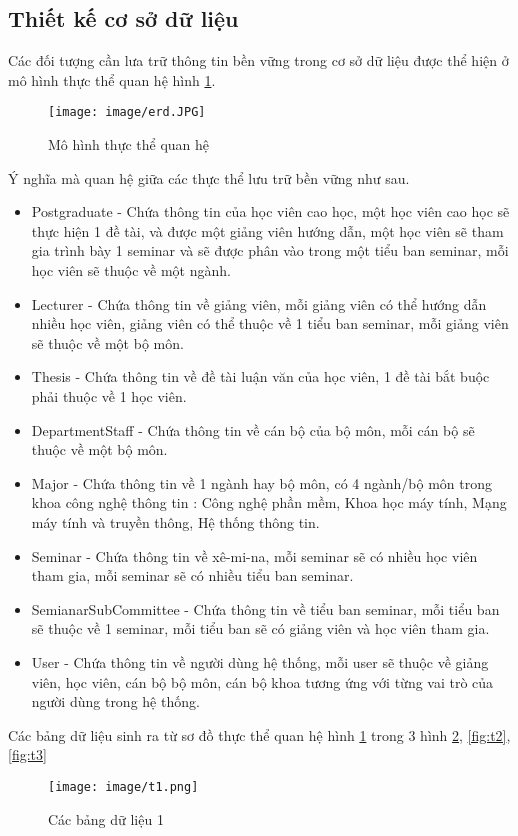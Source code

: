 \subsection{Thiết kế cơ sở dữ liệu}
Các đối tượng cần lưa trữ thông tin bền vững trong cơ sở dữ liệu được thể hiện ở mô hình thực thể quan hệ hình \ref{fig:erd}.
\begin{figure}[htbp]
	\centering
		\texttt{[image: image/erd.JPG]}
	\caption{Mô hình thực thể quan hệ}
	\label{fig:erd}
\end{figure}
Ý nghĩa mà quan hệ giữa các thực thể lưu trữ bền vững như sau.
\begin{itemize}
\item Postgraduate - Chứa thông tin của học viên cao học, một học viên cao học sẽ thực hiện 1 đề tài, và được một giảng viên hướng dẫn, một học viên sẽ tham gia trình bày 1 seminar và sẽ được phân vào trong một tiểu ban seminar, mỗi học viên sẽ thuộc về một ngành.
\item Lecturer - Chứa thông tin về giảng viên, mỗi giảng viên có thể hướng dẫn nhiều học viên, giảng viên có thể thuộc về 1 tiểu ban seminar, mỗi giảng viên sẽ thuộc về một bộ môn.
\item Thesis - Chứa thông tin về đề tài luận văn của học viên, 1 đề tài bắt buộc phải thuộc về 1 học viên.
\item  DepartmentStaff - Chứa thông tin về cán bộ của bộ môn, mỗi cán bộ sẽ thuộc về một bộ môn.
\item Major - Chứa thông tin về 1 ngành hay bộ môn, có 4 ngành/bộ môn trong khoa công nghệ thông tin : Công nghệ phần mềm, Khoa học máy tính, Mạng máy tính và truyền thông, Hệ thống thông tin.
\item Seminar - Chứa thông tin về xê-mi-na, mỗi seminar sẽ có nhiều học viên tham gia, mỗi seminar sẽ có nhiều tiểu ban seminar.
\item SemianarSubCommittee - Chứa thông tin về tiểu ban seminar, mỗi tiểu ban sẽ thuộc về 1 seminar, mỗi tiểu ban sẽ có giảng viên và học viên tham gia.
\item User - Chứa thông tin về người dùng hệ thống, mỗi user sẽ thuộc về giảng viên, học viên, cán bộ bộ môn, cán bộ khoa tương ứng với từng vai trò của người dùng trong hệ thống.
\end{itemize}
Các bảng dữ liệu sinh ra từ sơ đồ thực thể quan hệ hình \ref{fig:erd} trong 3 hình \ref{fig:t1}, \ref{fig:t2}, \ref{fig:t3}
\begin{figure}[htbp]
	\centering
		\texttt{[image: image/t1.png]}
	\caption{Các bảng dữ liệu 1}
	\label{fig:t1}
\end{figure}

